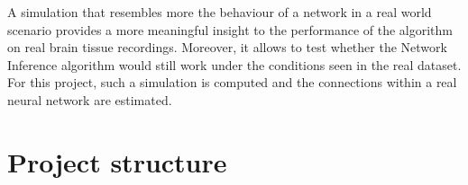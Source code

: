 A simulation that resembles more the behaviour of a network in a real world scenario provides a more meaningful insight to the performance of the algorithm on real brain tissue recordings. Moreover, it allows to test whether the Network Inference algorithm would still work under the conditions seen in the real dataset. For this project, such a simulation is computed and the connections within a real neural network are estimated.

\section{Project structure}
